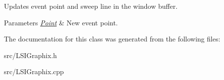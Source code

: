 Updates event point and sweep line in the window buffer. 
\begin{DoxyParams}{Parameters}
{\em \hyperlink{classPoint}{Point}} & New event point. \\
\hline
\end{DoxyParams}


The documentation for this class was generated from the following files\+:\begin{DoxyCompactItemize}
\item 
src/L\+S\+I\+Graphix.\+h\item 
src/L\+S\+I\+Graphix.\+cpp\end{DoxyCompactItemize}
